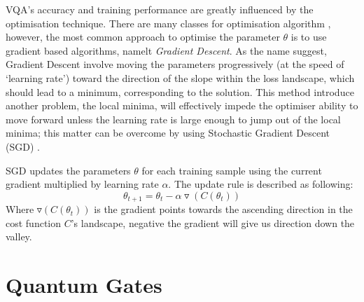 VQA's accuracy and training performance are greatly influenced by the optimisation technique.
There are many classes for optimisation algorithm \cite{zaheerStudyOptimizationAlgorithms2019a}, however, the most common approach to optimise the parameter $\theta$ is to use gradient based algorithms, namelt \emph{Gradient Descent}.
As the name suggest, Gradient Descent involve moving the parameters progressively (at the speed of `learning rate') toward the direction of the slope within the loss landscape, which should lead to a minimum, corresponding to the solution.
This method introduce another problem, the local minima, will effectively impede the optimiser ability to move forward unless the learning rate is large enough to jump out of the local minima; this matter can be overcome by using Stochastic Gradient Descent (SGD) \cite{ruderOverviewGradientDescent2017}.

SGD updates the parameters $\theta$ for each training sample using the current gradient multiplied by learning rate $\alpha$.
The update rule is described as following:
\begin{equation}
    \theta_{t+1} = \theta_t - \alpha \triangledown(C(\theta_t))
    \label{Eqn: SGD update rule}
\end{equation}
Where $\triangledown(C(\theta_t))$ is the gradient points towards the ascending direction in the cost function $C$'s landscape, negative the gradient will give us direction down the valley.

\section{Quantum Gates} \label{Sec: Quantum Gates}


